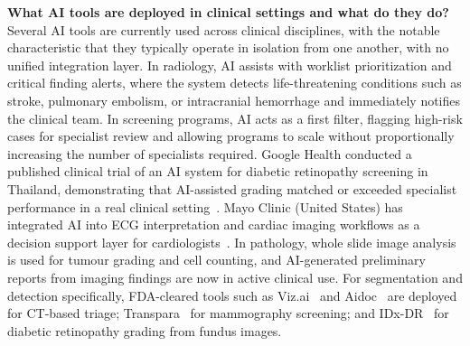 \documentclass[conference]{IEEEtran}
\begin{document}
\textbf{What AI tools are deployed in clinical settings and what do they do?}
Several AI tools are currently used across clinical disciplines, with the notable characteristic that they typically operate in isolation from one another, with no unified integration layer. In radiology, AI assists with worklist prioritization and critical finding alerts, where the system detects life-threatening conditions such as stroke, pulmonary embolism, or intracranial hemorrhage and immediately notifies the clinical team. In screening programs, AI acts as a first filter, flagging high-risk cases for specialist review and allowing programs to scale without proportionally increasing the number of specialists required. Google Health conducted a published clinical trial of an AI system for diabetic retinopathy screening in Thailand, demonstrating that AI-assisted grading matched or exceeded specialist performance in a real clinical setting~\cite{ruamviboonsuk2022retinopathy, wolf2024access}. Mayo Clinic (United States) has integrated AI into ECG interpretation and cardiac imaging workflows as a decision support layer for cardiologists~\cite{mayoclinic-ai-cardiology}. In pathology, whole slide image analysis is used for tumour grading and cell counting, and AI-generated preliminary reports from imaging findings are now in active clinical use. For segmentation and detection specifically, FDA-cleared tools such as Viz.ai~\cite{vizai} and Aidoc~\cite{aidoc} are deployed for CT-based triage; Transpara~\cite{transpara} for mammography screening; and IDx-DR~\cite{idxdr} for diabetic retinopathy grading from fundus images.
\end{document}
